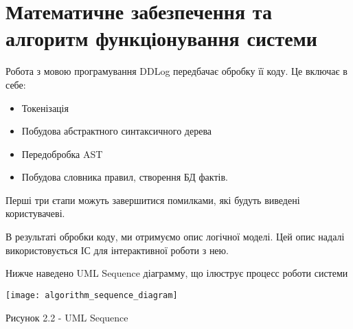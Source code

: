 \section{Математичне забезпечення та алгоритм функціонування системи}

Робота з мовою програмування DDLog передбачає обробку її коду. Це включає в себе:

\begin{itemize}
	\item Токенізація
	\item Побудова абстрактного синтаксичного дерева
	\item Передобробка AST
	\item Побудова словника правил, створення БД фактів.
\end{itemize}

Перші три єтапи можуть завершитися помилками, які будуть виведені користувачеві.

В результаті обробки коду, ми отримуємо опис логічної моделі. Цей опис надалі використовується ІС для інтерактивної роботи з нею.

Нижче наведено UML Sequence діаграмму, що ілюструє процесс роботи системи


\begin{center}

\texttt{[image: algorithm\_sequence\_diagram]}

Рисунок 2.2 - UML Sequence
\end{center}


